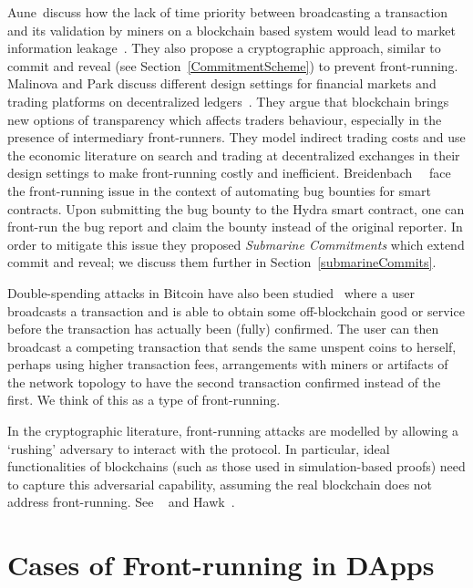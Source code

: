 Aune~\etal discuss how the lack of time priority between broadcasting a transaction and its validation by miners on a blockchain based system would lead to market information leakage~\cite{aune2017footprints}. They also propose a cryptographic approach, similar to commit and reveal (see Section~\ref{CommitmentScheme}) to prevent front-running. Malinova and Park discuss different design settings for financial markets and trading platforms on decentralized ledgers~\cite{malinova2017market}. They argue that blockchain brings new options of transparency which affects traders behaviour, especially in the presence of intermediary front-runners. They model indirect trading costs and use the economic literature on search and trading at decentralized exchanges in their design settings to make front-running costly and inefficient. Breidenbach~\etal~\cite{breidenbach2018enter} face the front-running issue in the context of automating bug bounties for smart contracts. Upon submitting the bug bounty to the Hydra smart contract, one can front-run the bug report and claim the bounty instead of the original reporter. In order to mitigate this issue they proposed \textit{Submarine Commitments} which extend commit and reveal; we discuss them further in Section~\ref{submarineCommits}.

Double-spending attacks in Bitcoin have also been studied~\cite{bamert2013have,karame2012double} where a user broadcasts a transaction and is able to obtain some off-blockchain good or service before the transaction has actually been (fully) confirmed. The user can then broadcast a competing transaction that sends the same unspent coins to herself, perhaps using higher transaction fees, arrangements with miners or artifacts of the network topology to have the second transaction confirmed instead of the first. We think of this as a type of front-running.

In the cryptographic literature, front-running attacks are modelled by allowing a `rushing' adversary to interact with the protocol. In particular, ideal functionalities of blockchains (such as those used in simulation-based proofs) need to capture this adversarial capability, assuming the real blockchain does not address front-running. See \eg~\cite{garay2015bitcoin} and Hawk~\cite{kosba2016hawk}.


\section{Cases of Front-running in DApps}  


